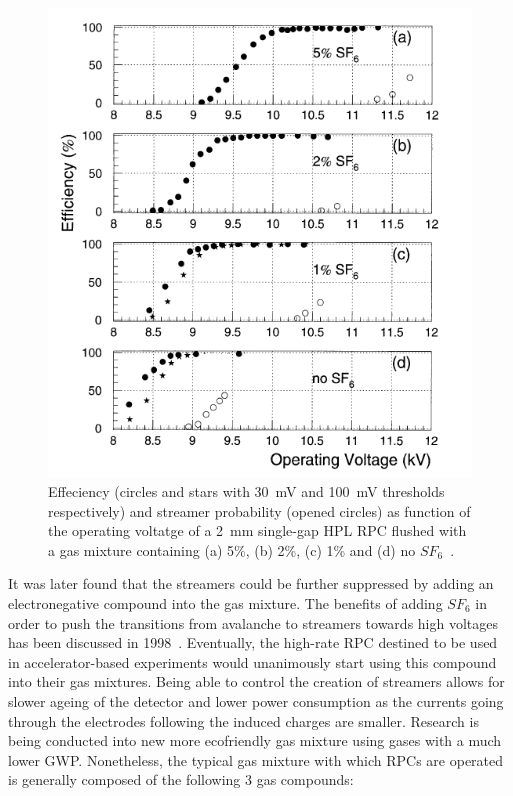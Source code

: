 \newpage
	
\begingroup\setlength{\intextsep}{0pt}\setlength{\columnsep}{15pt}
	
	\begin{figure}
		\centering
		\includegraphics[width = .85\linewidth]{fig/chapt3/SF6.png}
		\caption{\label{fig:SF6} Effeciency (circles and stars with \SI{30}{mV} and \SI{100}{mV} thresholds respectively) and streamer probability (opened circles) as function of the operating voltatge of a \SI{2}{mm} single-gap HPL RPC flushed with a gas mixture containing (a) 5\%, (b) 2\%, (c) 1\% and (d) no $SF_6$~\cite{CAMARRI98}.}
	\end{figure}
	
	It was later found that the streamers could be further suppressed by adding an electronegative compound into the gas mixture. The benefits of adding $SF_6$ in order to push the transitions from avalanche to streamers towards high voltages has been discussed in 1998~\cite{CAMARRI98,ZEBALLOS98}. Eventually, the high-rate RPC destined to be used in accelerator-based experiments would unanimously start using this compound into their gas mixtures. Being able to control the creation of streamers allows for slower ageing of the detector and lower power consumption as the currents going through the electrodes following the induced charges are smaller. Research is being conducted into new more ecofriendly gas mixture using gases with a much lower \acl{GWP}. Nonetheless, the typical gas mixture with which RPCs are operated is generally composed of the following 3 gas compounds:
	
